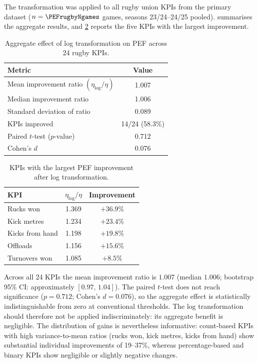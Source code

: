 The transformation was applied to all \PEFrugbyNkpis{} rugby union KPIs from the primary dataset ($n=\PEFrugbyNgames$ games, seasons 23/24--24/25 pooled).  summarises the aggregate results, and \cref{tab:log_top} reports the five KPIs with the largest improvement.

\begin{table}[t]
  \centering
  \caption{Aggregate effect of log transformation on PEF across 24 rugby KPIs.}
  \label{tab:log_summary}
  \begin{tabular}{@{}lc@{}}
    \toprule
    \textbf{Metric} & \textbf{Value} \\
    \midrule
    Mean improvement ratio $(\eta_{\log}/\eta)$ & 1.007 \\
    Median improvement ratio                    & 1.006 \\
    Standard deviation of ratio                 & 0.089 \\
    KPIs improved                               & 14/24 (58.3\%) \\
    Paired $t$-test ($p$-value)                 & 0.712 \\
    Cohen's $d$                                 & 0.076 \\
    \bottomrule
  \end{tabular}
\end{table}

\begin{table}[t]
  \centering
  \caption{KPIs with the largest PEF improvement after log transformation.}
  \label{tab:log_top}
  \begin{tabular}{@{}lcc@{}}
    \toprule
    \textbf{KPI} & $\eta_{\log}/\eta$ & \textbf{Improvement} \\
    \midrule
    Rucks won       & 1.369 & $+36.9\%$ \\
    Kick metres     & 1.234 & $+23.4\%$ \\
    Kicks from hand & 1.198 & $+19.8\%$ \\
    Offloads        & 1.156 & $+15.6\%$ \\
    Turnovers won   & 1.085 & $+8.5\%$  \\
    \bottomrule
  \end{tabular}
\end{table}

Across all 24 KPIs the mean improvement ratio is $1.007$ (median $1.006$; bootstrap 95\% CI: approximately $[0.97,\,1.04]$). The paired $t$-test does not reach significance ($p=0.712$; Cohen's $d=0.076$), so the aggregate effect is statistically indistinguishable from zero at conventional thresholds. The log transformation should therefore not be applied indiscriminately: its aggregate benefit is negligible. The distribution of gains is nevertheless informative: count-based KPIs with high variance-to-mean ratios (rucks won, kick metres, kicks from hand) show substantial individual improvements of 19--37\%, whereas percentage-based and binary KPIs show negligible or slightly negative changes.


